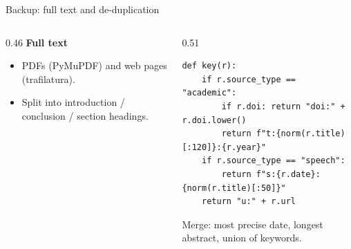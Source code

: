 \documentclass[aspectratio=169,10pt]{beamer}
\begin{document}
\begin{frame}[fragile]{Backup: full text and de-duplication}
\begin{columns}[T]
\begin{column}{0.46\textwidth}\small
\textbf{Full text}
\begin{itemize}
\item PDFs (PyMuPDF) and web pages (trafilatura).
\item Split into introduction / conclusion / section headings.
\end{itemize}
\end{column}
\begin{column}{0.51\textwidth}
\begin{lstlisting}
def key(r):
    if r.source_type == "academic":
        if r.doi: return "doi:" + r.doi.lower()
        return f"t:{norm(r.title)[:120]}:{r.year}"
    if r.source_type == "speech":
        return f"s:{r.date}:{norm(r.title)[:50]}"
    return "u:" + r.url
\end{lstlisting}
\small Merge: most precise date, longest abstract, union of keywords.
\end{column}
\end{columns}
\end{frame}
\end{document}
